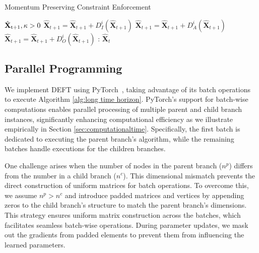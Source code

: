 \begin{algorithm}[t]
\caption{Momentum Preserving Constraint Enforcement} 
\label{alg:constraints enforcement}
\begin{algorithmic}[1]
\Require $\hat{\mathbf{X}}_\text{t+1}, \kappa > 0$
        \State $\hat{\mathbf{X}}_{t+1} = \hat{\mathbf{X}}_{t+1} + D^i_I(\hat{\mathbf{X}}_{t+1})$
        \State $\hat{\mathbf{X}}_{t+1} = \hat{\mathbf{X}}_{t+1} + D^i_A(\hat{\mathbf{X}}_{t+1})$ 
        \State $\hat{\mathbf{X}}_{t+1} = \hat{\mathbf{X}}_{t+1} + D^i_O(\hat{\mathbf{X}}_{t+1})$ 
        \EndIf
    \EndFor
\EndWhile
\State \Return: $\hat{\textbf{X}}_{t}$ 
\end{algorithmic}
\end{algorithm}

\subsection{Parallel Programming}
\label{section:parallelprogramming}

We implement DEFT using PyTorch~\cite{pytorch}, taking advantage of its batch operations to execute Algorithm \ref{alg:long time horizon}. 
PyTorch's support for batch-wise computations enables parallel processing of multiple parent and child branch instances, significantly enhancing computational efficiency as we illustrate empirically in Section \ref{sec:computationaltime}.
Specifically, the first batch is dedicated to executing the parent branch's algorithm, while the remaining batches handle executions for the children branches. 

One challenge arises when the number of nodes in the parent branch ($n^p$) differs from the number in a child branch ($n^c$). 
This dimensional mismatch prevents the direct construction of uniform matrices for batch operations.
To overcome this, we assume $n^p > n^c$ and introduce padded matrices and vertices by appending zeros to the child branch's structure to match the parent branch's dimensions. 
This strategy ensures uniform matrix construction across the batches, which facilitates seamless batch-wise operations. 
During parameter updates, we mask out the gradients from padded elements to prevent them from influencing the learned parameters.



